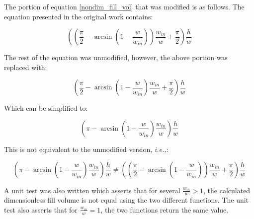 The portion of equation \eqref{nondim_fill_vol} that was modified is as follows. The equation
presented in the original work contains:

$$
\left(\left(\frac{\pi}{2} -
\arcsin\left(1 - \frac{w}{w_{in}}\right)\right)\frac{w_{in}}{w} +
\frac{\pi}{2}\right)\frac{h}{w}
$$

The rest of the equation was unmodified, however, the above portion was replaced with:

$$
\left(\frac{\pi}{2} -
\arcsin\left(1 - \frac{w}{w_{in}}\right)\frac{w_{in}}{w} +
\frac{\pi}{2}\right)\frac{h}{w}
$$

Which can be simplified to:

$$
\left(\pi -
\arcsin\left(1 - \frac{w}{w_{in}}\right)\frac{w_{in}}{w}
\right)\frac{h}{w}
$$

This is not equivalent to the unmodified version, \emph{i.e.,}:

$$
\left(\pi -
\arcsin\left(1 - \frac{w}{w_{in}}\right)\frac{w_{in}}{w}
\right)\frac{h}{w}
\neq
\left(\left(\frac{\pi}{2} -
\arcsin\left(1 - \frac{w}{w_{in}}\right)\right)\frac{w_{in}}{w} +
\frac{\pi}{2}\right)\frac{h}{w}
$$

A unit test was also written which asserts that for several $\frac{w_{in}}{w}>1$, the 
calculated dimensionless fill volume is not equal using the two different functions.
The unit test also asserts that for $\frac{w_{in}}{w}=1$, the two functions return
the same value.

